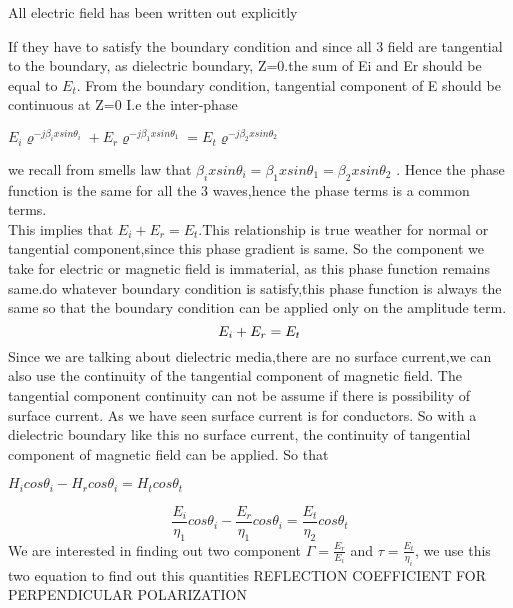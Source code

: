 All electric field has been written out explicitly 

If they have to satisfy the boundary  condition and since all 3 field are tangential  to the boundary, as dielectric boundary, Z=0.the sum of Ei and Er should be equal to $E_{t}$. From the boundary condition, tangential component of E should be continuous  at Z=0 I.e the inter-phase\\ 
\begin{center}
	$E_{i} \varrho^{-j \beta_{i} x sin\theta_{i}} + E_{r} \varrho^{-j \beta_{1} x sin\theta_{1}} = E_{t} \varrho^{-j \beta_{2} x sin\theta_{2}}$
\end{center}
we recall from smells law that $\beta_{i} x sin\theta_{i} = \beta_{1} x sin\theta_{1} = \beta_{2} x sin\theta_{2}$ .
Hence the phase function is the same for all the 3 waves,hence the phase terms is a common terms.\\
This implies that $ E_{i} + E_{r} = E_{t}$.This relationship is true weather  for normal or tangential component,since this phase gradient is same. So the component we take for electric or magnetic field  is immaterial, as this phase function remains same.do whatever boundary condition is satisfy,this phase function  is always  the same so that the boundary  condition can be applied only on the amplitude term. 
\begin{equation}
\centering
 E_{i} + E_{r} = E_{t}
\end{equation}
Since we are talking about dielectric media,there are no surface current,we can also use the continuity of the tangential  component of magnetic field. The tangential component continuity can not be assume if there is possibility of surface current. As we have seen surface current is for conductors. So with a dielectric boundary like  this no surface current, the continuity of tangential component  of magnetic field can be applied. So that 
\begin{center}
	$H_{i} cos\theta_{i} - H_{r} cos\theta_{i} = H_{t} cos\theta_{t}$
\end{center}
\begin{equation}
\frac{E_{i}}{\eta_{1}} cos\theta_{i} - \frac{E_{r}}{\eta_{1}} cos\theta_{i} = \frac{E_{t}}{\eta_{2}} cos\theta_{t}
\end{equation}
We are interested in finding out two component $\Gamma = \frac{E_{r}}{E_{i}}$ and $ \tau = \frac{E_{t}}{\eta_{i}}$, we use this two equation to find out this quantities 
REFLECTION COEFFICIENT FOR PERPENDICULAR POLARIZATION\newline
